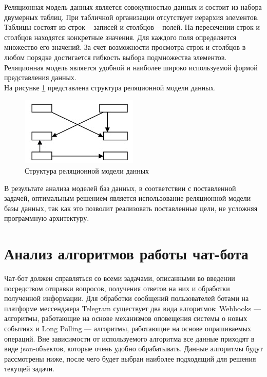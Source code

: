 \documentclass[12pt,a4paper,oneside]{report}
\begin{document}
Реляционная модель данных является совокупностью данных и состоит из набора двумерных таблиц. При табличной организации отсутствует иерархия элементов. Таблицы состоят из строк – записей и столбцов – полей. На пересечении строк и столбцов находятся конкретные значения. Для каждого поля определяется множество его значений. За счет возможности просмотра строк и столбцов в любом порядке достигается гибкость выбора подмножества элементов. Реляционная модель является удобной и наиболее широко используемой формой представления данных\cite{rel}.\\

На рисунке \ref{ris:rel} представлена структура реляционной модели данных.
\begin{figure}[h]
	\centering
	\includegraphics[scale=1]{3.png}
	\caption{Структура реляционной модели данных}
	\label{ris:rel}
\end{figure}

В результате анализа моделей баз данных, в соответствии с поставленной задачей, оптимальным решением является использование реляционной модели базы данных, так как это позволит реализовать поставленные цели, не усложняя программную архитектуру.

\section{Анализ алгоритмов работы чат-бота}
Чат-бот должен справляться со всеми задачами, описанными во введении посредством отправки вопросов, получения ответов на них и обработки полученной информации. Для обработки сообщений пользователей ботами на платформе мессенджера Telegram существует два вида алгоритмов: Webhooks — алгоритмы, работающие на основе механизмов оповещения системы о новых событиях и Long Polling — алгоритмы, работающие на основе опрашиваемых операций. Вне зависимости от используемого алгоритма все данные приходят в виде json-объектов, которые очень удобно обрабатывать.
Данные алгоритмы будут рассмотрены ниже, после чего будет выбран наиболее подходящий для решения текущей задачи.
\end{document}
